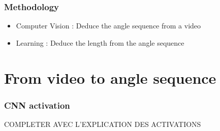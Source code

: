 \documentclass{beamer}
\begin{document}
\begin{frame}
\frametitle{Methodology}
\begin{itemize}
  \item Computer Vision : Deduce the angle sequence from a video
  \item Learning : Deduce the length from the angle sequence
\end{itemize}
\end{frame}

\section{From video to angle sequence}

\begin{frame}
\frametitle{CNN activation}
COMPLETER AVEC L'EXPLICATION DES ACTIVATIONS
\end{frame}
\end{document}
